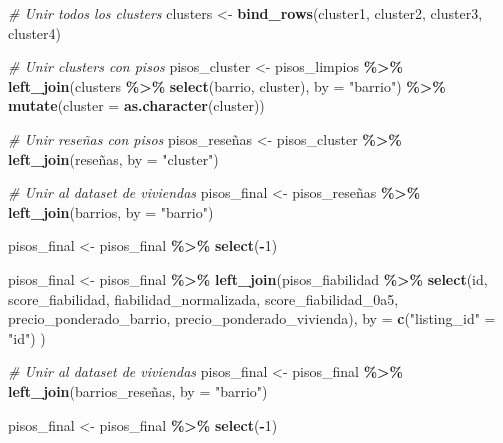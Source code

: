 \documentclass[
]{article}
\newenvironment{Shaded}{\begin{snugshade}}{\end{snugshade}}
\newcommand{\AttributeTok}[1]{\textcolor[rgb]{0.13,0.29,0.53}{#1}}
\newcommand{\CommentTok}[1]{\textcolor[rgb]{0.56,0.35,0.01}{\textit{#1}}}
\newcommand{\DecValTok}[1]{\textcolor[rgb]{0.00,0.00,0.81}{#1}}
\newcommand{\FunctionTok}[1]{\textcolor[rgb]{0.13,0.29,0.53}{\textbf{#1}}}
\newcommand{\NormalTok}[1]{#1}
\newcommand{\OtherTok}[1]{\textcolor[rgb]{0.56,0.35,0.01}{#1}}
\newcommand{\SpecialCharTok}[1]{\textcolor[rgb]{0.81,0.36,0.00}{\textbf{#1}}}
\newcommand{\StringTok}[1]{\textcolor[rgb]{0.31,0.60,0.02}{#1}}
\begin{document}
\begin{Shaded}
\begin{Highlighting}[]
\CommentTok{\# Unir todos los clusters}
\NormalTok{clusters }\OtherTok{\textless{}{-}} \FunctionTok{bind\_rows}\NormalTok{(cluster1, cluster2, cluster3, cluster4)}

\CommentTok{\# Unir clusters con pisos}
\NormalTok{pisos\_cluster }\OtherTok{\textless{}{-}}\NormalTok{ pisos\_limpios }\SpecialCharTok{\%\textgreater{}\%}
  \FunctionTok{left\_join}\NormalTok{(clusters }\SpecialCharTok{\%\textgreater{}\%} \FunctionTok{select}\NormalTok{(barrio, cluster), }\AttributeTok{by =} \StringTok{"barrio"}\NormalTok{) }\SpecialCharTok{\%\textgreater{}\%}
  \FunctionTok{mutate}\NormalTok{(}\AttributeTok{cluster =} \FunctionTok{as.character}\NormalTok{(cluster))}

\CommentTok{\# Unir reseñas con pisos }
\NormalTok{pisos\_reseñas }\OtherTok{\textless{}{-}}\NormalTok{ pisos\_cluster }\SpecialCharTok{\%\textgreater{}\%}
  \FunctionTok{left\_join}\NormalTok{(reseñas, }\AttributeTok{by =} \StringTok{"cluster"}\NormalTok{)}

\CommentTok{\# Unir al dataset de viviendas}
\NormalTok{pisos\_final }\OtherTok{\textless{}{-}}\NormalTok{ pisos\_reseñas }\SpecialCharTok{\%\textgreater{}\%}
  \FunctionTok{left\_join}\NormalTok{(barrios, }\AttributeTok{by =} \StringTok{"barrio"}\NormalTok{)}

\NormalTok{pisos\_final }\OtherTok{\textless{}{-}}\NormalTok{ pisos\_final }\SpecialCharTok{\%\textgreater{}\%} \FunctionTok{select}\NormalTok{(}\SpecialCharTok{{-}}\DecValTok{1}\NormalTok{)}

\NormalTok{pisos\_final }\OtherTok{\textless{}{-}}\NormalTok{ pisos\_final }\SpecialCharTok{\%\textgreater{}\%}
  \FunctionTok{left\_join}\NormalTok{(pisos\_fiabilidad }\SpecialCharTok{\%\textgreater{}\%}
      \FunctionTok{select}\NormalTok{(id, score\_fiabilidad, fiabilidad\_normalizada, score\_fiabilidad\_0a5, precio\_ponderado\_barrio, precio\_ponderado\_vivienda),}
    \AttributeTok{by =} \FunctionTok{c}\NormalTok{(}\StringTok{"listing\_id"} \OtherTok{=} \StringTok{"id"}\NormalTok{)}
\NormalTok{  )}

\CommentTok{\# Unir al dataset de viviendas}
\NormalTok{pisos\_final }\OtherTok{\textless{}{-}}\NormalTok{ pisos\_final }\SpecialCharTok{\%\textgreater{}\%}
  \FunctionTok{left\_join}\NormalTok{(barrios\_reseñas, }\AttributeTok{by =} \StringTok{"barrio"}\NormalTok{)}

\NormalTok{pisos\_final }\OtherTok{\textless{}{-}}\NormalTok{ pisos\_final }\SpecialCharTok{\%\textgreater{}\%} \FunctionTok{select}\NormalTok{(}\SpecialCharTok{{-}}\DecValTok{1}\NormalTok{)}
\end{Highlighting}
\end{Shaded}
\end{document}
